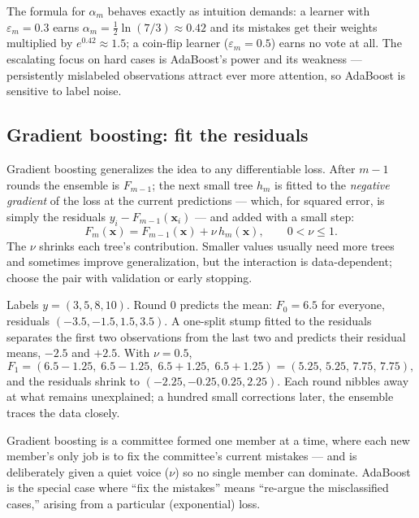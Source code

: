 The formula for $\alpha_m$ behaves exactly as intuition demands: a learner with $\varepsilon_m=0.3$ earns $\alpha_m=\tfrac{1}{2}\ln(7/3)\approx 0.42$ and its mistakes get their weights multiplied by $e^{0.42}\approx 1.5$; a coin-flip learner ($\varepsilon_m=0.5$) earns no vote at all. The escalating focus on hard cases is AdaBoost's power and its weakness --- persistently mislabeled observations attract ever more attention, so AdaBoost is sensitive to label noise.

\subsection{Gradient boosting: fit the residuals}
\label{sec:gradient-boosting}

Gradient boosting generalizes the idea to any differentiable loss. After $m-1$ rounds the ensemble is $F_{m-1}$; the next small tree $h_m$ is fitted to the \emph{negative gradient} of the loss at the current predictions --- which, for squared error, is simply the residuals $y_i-F_{m-1}(\bm{x}_i)$ --- and added with a small step:
\[
  F_m(\bm{x})
  =F_{m-1}(\bm{x})+\nu\,h_m(\bm{x}),
  \qquad 0<\nu\leq 1.
\]
The  $\nu$ shrinks each tree's contribution. Smaller values usually need more trees and sometimes improve generalization, but the interaction is data-dependent; choose the pair with validation or early stopping.

\begin{workedexample}
Labels $y=(3,5,8,10)$. Round 0 predicts the mean: $F_0=6.5$ for everyone, residuals $(-3.5,-1.5,1.5,3.5)$. A one-split stump fitted to the residuals separates the first two observations from the last two and predicts their residual means, $-2.5$ and $+2.5$. With $\nu=0.5$,
\[
  F_1=(6.5-1.25,\;6.5-1.25,\;6.5+1.25,\;6.5+1.25)
  =(5.25,\,5.25,\,7.75,\,7.75),
\]
and the residuals shrink to $(-2.25,-0.25,0.25,2.25)$. Each round nibbles away at what remains unexplained; a hundred small corrections later, the ensemble traces the data closely.
\end{workedexample}

\begin{intuition}
Gradient boosting is a committee formed one member at a time, where each new member's only job is to fix the committee's current mistakes --- and is deliberately given a quiet voice ($\nu$) so no single member can dominate. AdaBoost is the special case where ``fix the mistakes'' means ``re-argue the misclassified cases,'' arising from a particular (exponential) loss.
\end{intuition}

